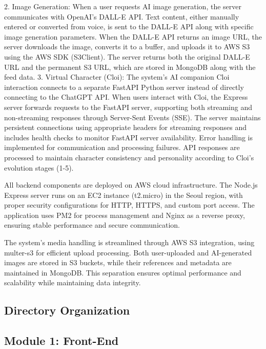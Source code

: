             2. Image Generation: When a user requests AI image generation, the server communicates with OpenAI's DALL-E API. Text content, either manually entered or converted from voice, is sent to the DALL-E API along with specific image generation parameters. When the DALL-E API returns an image URL, the server downloads the image, converts it to a buffer, and uploads it to AWS S3 using the AWS SDK (S3Client). The server returns both the original DALL-E URL and the permanent S3 URL, which are stored in MongoDB along with the feed data.
            3. Virtual Character (Cloi): The system's AI companion Cloi interaction connects to a separate FastAPI Python server instead of directly connecting to the ChatGPT API. When users interact with Cloi, the Express server forwards requests to the FastAPI server, supporting both streaming and non-streaming responses through Server-Sent Events (SSE). The server maintains persistent connections using appropriate headers for streaming responses and includes health checks to monitor FastAPI server availability. Error handling is implemented for communication and processing failures. API responses are processed to maintain character consistency and personality according to Cloi's evolution stages (1-5).
            
            All backend components are deployed on AWS cloud infrastructure. The Node.js Express server runs on an EC2 instance (t2.micro) in the Seoul region, with proper security configurations for HTTP, HTTPS, and custom port access. The application uses PM2 for process management and Nginx as a reverse proxy, ensuring stable performance and secure communication.
            
            The system's media handling is streamlined through AWS S3 integration, using multer-s3 for efficient upload processing. Both user-uploaded and AI-generated images are stored in S3 buckets, while their references and metadata are maintained in MongoDB. This separation ensures optimal performance and scalability while maintaining data integrity.
            \vspace{3mm}
            
    \subsection{Directory Organization}
    \subsection{Module 1: Front-End}
